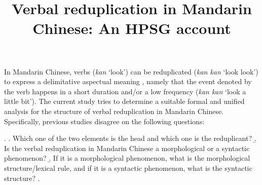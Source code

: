 \documentclass[
a4paper,
10pt,
oneside,
]{scrartcl}
\author{\vspace{-8ex}}
\title{\Large Verbal reduplication in Mandarin Chinese: An HPSG account}
\date{\vspace{-8ex}}
\begin{document}
\maketitle




\noindent
In Mandarin Chinese, verbs (\emph{kan} `look’) can be reduplicated (\emph{kan kan} `look look’) to express a delimitative aspectual meaning \citep[e.g.][]{Chao1968, LiThompson1981, XiaoMcEnery2004}, namely that the event denoted by the verb happens in a short duration and/or a low frequency \citep[155]{XiaoMcEnery2004} (\emph{kan kan} `look a little bit'). The current study tries to determine a suitable formal and unified analysis for the structure of verbal reduplication in Mandarin Chinese. Specifically, previous studies disagree on the following questions:

\ex.
\a. Which one of the two elements is the head and which one is the reduplicant?
\b. Is the verbal reduplication in Mandarin Chinese a morphological or a syntactic phenomenon?
\b. If it is a morphological phenomenon, what is the morphological structure/lexical rule, and if it is a syntactic phenomenon, what is the syntactic structure?
\z.
\end{document}
